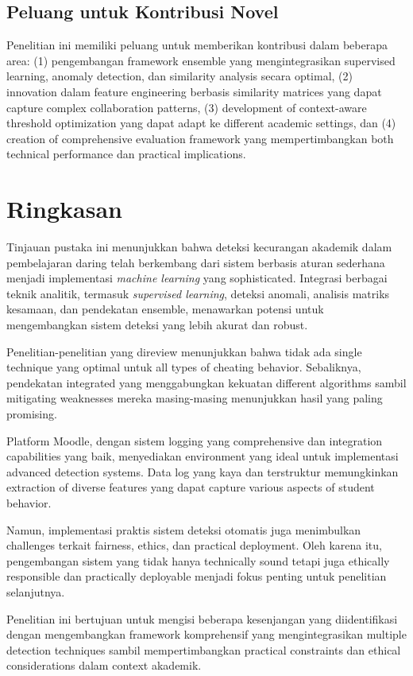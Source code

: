 \subsection{Peluang untuk Kontribusi Novel}

Penelitian ini memiliki peluang untuk memberikan kontribusi dalam beberapa area: (1) pengembangan framework ensemble yang mengintegrasikan supervised learning, anomaly detection, dan similarity analysis secara optimal, (2) innovation dalam feature engineering berbasis similarity matrices yang dapat capture complex collaboration patterns, (3) development of context-aware threshold optimization yang dapat adapt ke different academic settings, dan (4) creation of comprehensive evaluation framework yang mempertimbangkan both technical performance dan practical implications.

\section{Ringkasan}
\label{sec:ringkasanBab2}

Tinjauan pustaka ini menunjukkan bahwa deteksi kecurangan akademik dalam pembelajaran daring telah berkembang dari sistem berbasis aturan sederhana menjadi implementasi \textit{machine learning} yang sophisticated. Integrasi berbagai teknik analitik, termasuk \textit{supervised learning}, deteksi anomali, analisis matriks kesamaan, dan pendekatan ensemble, menawarkan potensi untuk mengembangkan sistem deteksi yang lebih akurat dan robust.

Penelitian-penelitian yang direview menunjukkan bahwa tidak ada single technique yang optimal untuk all types of cheating behavior. Sebaliknya, pendekatan integrated yang menggabungkan kekuatan different algorithms sambil mitigating weaknesses mereka masing-masing menunjukkan hasil yang paling promising.

Platform Moodle, dengan sistem logging yang comprehensive dan integration capabilities yang baik, menyediakan environment yang ideal untuk implementasi advanced detection systems. Data log yang kaya dan terstruktur memungkinkan extraction of diverse features yang dapat capture various aspects of student behavior.

Namun, implementasi praktis sistem deteksi otomatis juga menimbulkan challenges terkait fairness, ethics, dan practical deployment. Oleh karena itu, pengembangan sistem yang tidak hanya technically sound tetapi juga ethically responsible dan practically deployable menjadi fokus penting untuk penelitian selanjutnya.

Penelitian ini bertujuan untuk mengisi beberapa kesenjangan yang diidentifikasi dengan mengembangkan framework komprehensif yang mengintegrasikan multiple detection techniques sambil mempertimbangkan practical constraints dan ethical considerations dalam context akademik.
